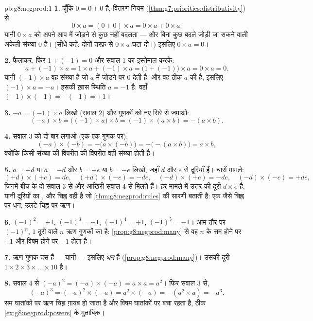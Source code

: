 \begin{solution}{pb:g8:negprod:1}
\textbf{1.} चूँकि $0 = 0 + 0$ है, वितरण नियम
(\cref{thm:g7:priorities:distributivity}) से
\[
0 \times a = (0 + 0) \times a = 0 \times a + 0 \times a .
\]
यानी $0 \times a$ को अपने आप में जोड़ने से कुछ नहीं बदलता --- और बिना
कुछ बदले जोड़ी जा सकने वाली अकेली संख्या $0$ है। (सीधे कहें: दोनों
तरफ़ से $0 \times a$ घटा दो।) इसलिए $0 \times a = 0$।

\textbf{2.} फैलाकर, फिर $1 + (-1) = 0$ और सवाल 1 का इस्तेमाल करके:
\[
a + (-1) \times a
= 1 \times a + (-1) \times a
= \bigl(1 + (-1)\bigr) \times a
= 0 \times a = 0 .
\]
यानी $(-1) \times a$ वह संख्या है जो $a$ में जोड़ने पर $0$ देती है:
और वह ठीक $a$ की  है, इसलिए $(-1) \times a = -a$।
 इसकी ख़ास स्थिति $a = -1$ है: वहाँ
$(-1) \times (-1) = -(-1) = +1$।

\textbf{3.} $-a = (-1) \times a$ लिखो (सवाल 2) और गुणकों को नए सिरे
से जमाओ:
\[
(-a) \times b
= \bigl((-1) \times a\bigr) \times b
= (-1) \times (a \times b)
= -(a \times b) .
\]

\textbf{4.} सवाल 3 को दो बार लगाओ (एक-एक गुणक पर):
\[
(-a) \times (-b)
= -\bigl(a \times (-b)\bigr)
= -\bigl(-(a \times b)\bigr)
= a \times b ,
\]
क्योंकि किसी संख्या की विपरीत की विपरीत वही संख्या होती है।

\textbf{5.} $a = +d$ या $a = -d$ और $b = +e$ या $b = -e$ लिखो, जहाँ
$d$ और $e$  से दूरियाँ हैं। चारों मामले:
\[
(+d) \times (+e) = de, \quad
(+d) \times (-e) = -de, \quad
(-d) \times (+e) = -de, \quad
(-d) \times (-e) = +de,
\]
जिनमें बीच के दो सवाल 3 से और आख़िरी सवाल 4 से मिलते हैं। हर मामले
में उत्तर की दूरी $d \times e$ है, यानी दूरियों का , और चिह्न
वही है जो \cref{thm:g8:negprod:rules} की सारणी बताती है: एक जैसे
चिह्न पर धन, उलटे चिह्न पर ऋण।

\textbf{6.} $(-1)^2 = +1$, $(-1)^3 = -1$, $(-1)^4 = +1$,
$(-1)^5 = -1$। आम तौर पर $(-1)^n$, $1$ दूरी वाले $n$ ऋण गुणकों का
 है: \cref{prop:g8:negprod:many} से वह $n$ के सम होने पर $+1$
और विषम होने पर $-1$ होता है।

\textbf{7.} ऋण गुणक दस हैं --- यानी  --- इसलिए 
\emph{धन} है (\cref{prop:g8:negprod:many})। उसकी दूरी
$1 \times 2 \times 3 \times \dots \times 10$ है।

\textbf{8.} सवाल 4 से $(-a)^2 = (-a) \times (-a) = a \times a =
a^2$। फिर सवाल 3 से,
\[
(-a)^3 = (-a)^2 \times (-a) = a^2 \times (-a) = -(a^2 \times a)
= -a^3 .
\]
सम घातांकों पर ऋण चिह्न ग़ायब हो जाता है और विषम घातांकों पर बचा रहता
है, ठीक \cref{ex:g8:negprod:powers} के मुताबिक़।


\end{solution}
